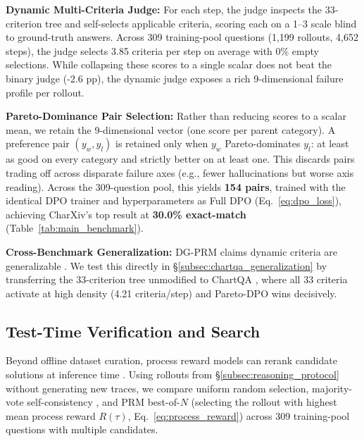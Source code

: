 \documentclass[11pt]{article}
\begin{document}
\textbf{Dynamic Multi-Criteria Judge:} For each step, the judge inspects the 33-criterion tree and self-selects applicable criteria, scoring each on a 1--3 scale blind to ground-truth answers. Across 309 training-pool questions (1,199 rollouts, 4,652 steps), the judge selects 3.85 criteria per step on average with 0\% empty selections. While collapsing these scores to a single scalar does not beat the binary judge (-2.6 pp), the dynamic judge exposes a rich 9-dimensional failure profile per rollout.

\textbf{Pareto-Dominance Pair Selection:} Rather than reducing scores to a scalar mean, we retain the 9-dimensional vector (one score per parent category). A preference pair $(y_w, y_l)$ is retained only when $y_w$ Pareto-dominates $y_l$: at least as good on every category and strictly better on at least one. This discards pairs trading off across disparate failure axes (e.g., fewer hallucinations but worse axis reading). Across the 309-question pool, this yields \textbf{154 pairs}, trained with the identical DPO trainer and hyperparameters as Full DPO (Eq.~\ref{eq:dpo_loss}), achieving CharXiv's top result at \textbf{30.0\% exact-match} (Table~\ref{tab:main_benchmark}).

\textbf{Cross-Benchmark Generalization:} DG-PRM claims dynamic criteria are generalizable \citep{yin2024dgprm}. We test this directly in \S\ref{subsec:chartqa_generalization} by transferring the 33-criterion tree unmodified to ChartQA \citep{masry2022chartqa}, where all 33 criteria activate at high density (4.21 criteria/step) and Pareto-DPO wins decisively.

\subsection{Test-Time Verification and Search}
\label{subsec:test_time_verification}

Beyond offline dataset curation, process reward models can rerank candidate solutions at inference time \citep{lightman2023prm}. Using rollouts from \S\ref{subsec:reasoning_protocol} without generating new traces, we compare uniform random selection, majority-vote self-consistency \citep{wang2023selfconsistency}, and PRM best-of-$N$ (selecting the rollout with highest mean process reward $R(\tau)$, Eq.~\ref{eq:process_reward}) across 309 training-pool questions with multiple candidates.
\end{document}

